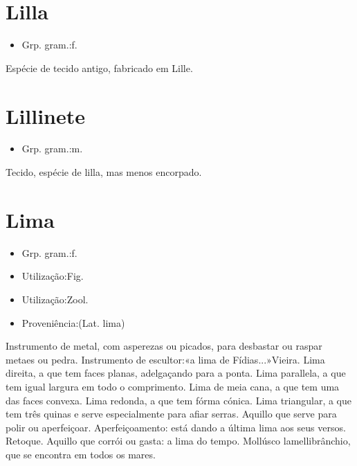 \section{Lilla}
\begin{itemize}
\item {Grp. gram.:f.}
\end{itemize}
Espécie de tecido antigo, fabricado em Lille.
\section{Lillinete}
\begin{itemize}
\item {Grp. gram.:m.}
\end{itemize}
Tecido, espécie de lilla, mas menos encorpado.
\section{Lima}
\begin{itemize}
\item {Grp. gram.:f.}
\end{itemize}
\begin{itemize}
\item {Utilização:Fig.}
\end{itemize}
\begin{itemize}
\item {Utilização:Zool.}
\end{itemize}
\begin{itemize}
\item {Proveniência:(Lat. \textunderscore lima\textunderscore )}
\end{itemize}
Instrumento de metal, com asperezas ou picados, para desbastar ou raspar metaes ou pedra.
Instrumento de escultor:«\textunderscore a lima de Fídias...\textunderscore »Vieira.
\textunderscore Lima direita\textunderscore , a que tem faces planas, adelgaçando para a ponta.
\textunderscore Lima parallela\textunderscore , a que tem igual largura em todo o comprimento.
\textunderscore Lima de meia cana\textunderscore , a que tem uma das faces convexa.
\textunderscore Lima redonda\textunderscore , a que tem fórma cónica.
\textunderscore Lima triangular\textunderscore , a que tem três quinas e serve especialmente para afiar serras.
Aquillo que serve para polir ou aperfeiçoar.
Aperfeiçoamento: \textunderscore está dando a última lima aos seus versos\textunderscore .
Retoque.
Aquillo que corrói ou gasta: \textunderscore a lima do tempo\textunderscore .
Mollúsco lamellibrânchio, que se encontra em todos os mares.

